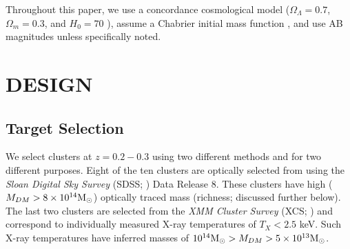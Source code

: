 Throughout this paper, we use a concordance cosmological model ($\Omega_\Lambda = 0.7$, $\Omega_m = 0.3$, and $H_0= 70$ \kms \mpc), assume a Chabrier initial mass function \citep{Chabrier2003}, and use AB magnitudes \citep{Oke1974} unless specifically noted.

\section{DESIGN}\label{sec:design} 
\subsection{Target Selection}\label{sec:selection} We select clusters at $z=0.2-0.3$ using two different methods and for two different purposes. Eight of the ten clusters are optically selected from \cite{Rykoff2012} using the \textit{Sloan Digital Sky Survey} (SDSS; \citealt{Blanton2001a}) Data Release 8. These clusters have high ($M_{DM} > 8\times10^{14}\hbox{$\mathrm{M}_\odot$}$) optically traced mass (richness; discussed further below). The last two clusters are selected from the \textit{XMM Cluster Survey} (XCS; \citealt{Mehrtens2012}) and correspond to individually measured X-ray temperatures of $T_X < 2.5$ keV. Such X-ray temperatures have inferred masses of $10^{14}\hbox{$\mathrm{M}_\odot$} > M_{DM} > 5\times10^{13}\hbox{$\mathrm{M}_\odot$}$.


